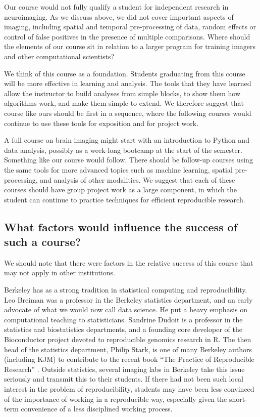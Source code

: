Our course would not fully qualify a student for independent research in
neuroimaging.  As we discuss above, we did not cover important aspects of
imaging, including spatial and temporal pre-processing of data, random effects
or control of false positives in the presence of multiple comparisons.  Where
should the elements of our course sit in relation to a larger program for
training imagers and other computational scientists?

We think of this course as a foundation.  Students graduating from this course
will be more effective in learning and analysis.  The tools that they have
learned allow the instructor to build analyses from simple blocks, to
show them how algorithms work, and make them simple to extend.  We therefore
suggest that course like ours should be first in a sequence, where the
following courses would continue to use these tools for exposition and for
project work.

A full course on brain imaging might start with an introduction to Python and
data analysis, possibly as a week-long bootcamp at the start of the semester.
Something like our course would follow.  There should be follow-up courses
using the same tools for more advanced topics such as machine learning,
spatial pre-processing, and analysis of other modalities. We suggest that each
of these courses should have group project work as a large component, in which
the student can continue to practice techniques for efficient reproducible
research.

\subsection{What factors would influence the success of such a course?}

We should note that there were factors in the relative success of this
course that may not apply in other institutions.

Berkeley has as a strong tradition in statistical computing and
reproducibility.  Leo Breiman was a professor in the Berkeley statistics
department, and an early advocate of what we would now call data science.  He
put a heavy emphasis on computational teaching to statisticians.  Sandrine
Dudoit is a professor in the statistics and biostatistics departments, and a
founding core developer of the Bioconductor project devoted to reproducible
genomics research in R.  The then head of the statistics department, Philip
Stark, is one of many Berkeley authors (including KJM) to contribute to the
recent book ``The Practice of Reproducible Research''
\citep{kitzes2017practice}. Outside statistics, several imaging labs in
Berkeley take this issue seriously and transmit this to their students.  If
there had not been such local interest in the problem of reproducibility,
students may have been less convinced of the importance of
working in a reproducible way, especially given the short-term convenience
of a less disciplined working process.


